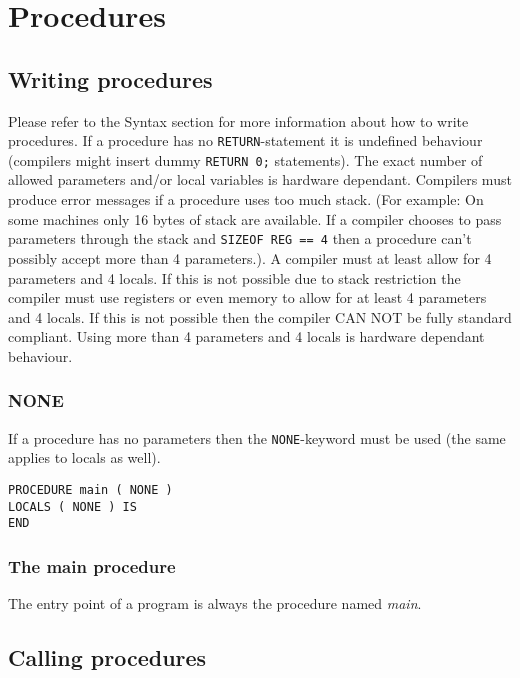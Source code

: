 \section{Procedures}

\subsection{Writing procedures}

Please refer to the Syntax section for more information about how to write procedures.
If a procedure has no \verb|RETURN|-statement it is undefined behaviour (compilers might insert dummy \verb|RETURN 0;| statements). 
The exact number of allowed parameters and/or local variables is hardware dependant. Compilers must produce error messages if a procedure uses too much stack.
(For example: On some machines only 16 bytes of stack are available. If a compiler chooses to pass parameters through the stack and \verb|SIZEOF REG == 4| then
a procedure can't possibly accept more than 4 parameters.). A compiler must at least allow for 4 parameters and 4 locals. If this is not possible due to stack restriction
the compiler must use registers or even memory to allow for at least 4 parameters and 4 locals. If this is not possible then the compiler CAN NOT be fully standard
compliant. Using more than 4 parameters and 4 locals is hardware dependant behaviour. 

\subsubsection{NONE}

If a procedure has no parameters then the \verb|NONE|-keyword must be used (the same applies to locals as well).

\begin{verbatim}
PROCEDURE main ( NONE )
LOCALS ( NONE ) IS
END
\end{verbatim}

\subsubsection{The main procedure}

The entry point of a program is always the procedure named \emph{main}. 

\subsection{Calling procedures}

